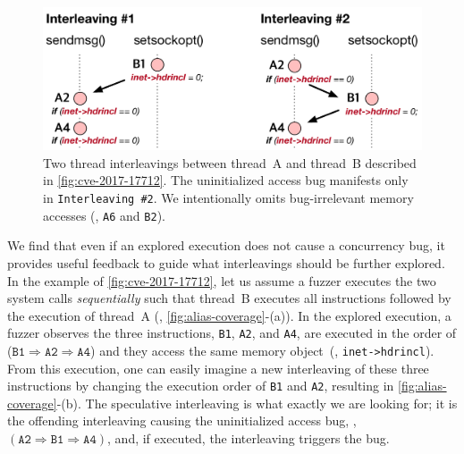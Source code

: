 \begin{figure}[t]
  \centering
  \includegraphics[width=0.8\linewidth]{fig/alias-coverage.pdf}
  \caption{Two thread interleavings between thread~A and thread~B
    described in \autoref{fig:cve-2017-17712}.
    The uninitialized access bug manifests only in
    \texttt{Interleaving \#2}.
    We intentionally omits bug-irrelevant memory accesses (\ie,
    \texttt{A6} and \texttt{B2}).}
  \label{fig:alias-coverage}
\end{figure}


%
We find that even if an explored execution does not cause a
concurrency bug, it provides useful feedback to guide what
interleavings should be further explored.
%
In the example of \autoref{fig:cve-2017-17712}, let us assume a fuzzer
executes the two system calls \textit{sequentially} such that thread~B
executes all instructions followed by the execution of thread~A (\ie,
\autoref{fig:alias-coverage}-(a)).  In the explored execution, a
fuzzer observes the three instructions, \texttt{B1}, \texttt{A2}, and
\texttt{A4}, are executed in the order of
($\texttt{B1} \Rightarrow \texttt{A2} \Rightarrow \texttt{A4}$) and
they access the same memory object~(\ie, \texttt{inet->hdrincl}).
%
From this execution, one can easily imagine a new interleaving of
these three instructions by changing the execution order of
\texttt{B1} and \texttt{A2}, resulting in
\autoref{fig:alias-coverage}-(b).
%
The speculative interleaving is what exactly we are looking for; it is
the offending interleaving causing the uninitialized access bug, \eg,
$(\texttt{A2} \Rightarrow \texttt{B1} \Rightarrow \texttt{A4})$, and,
if executed, the interleaving triggers the bug.

